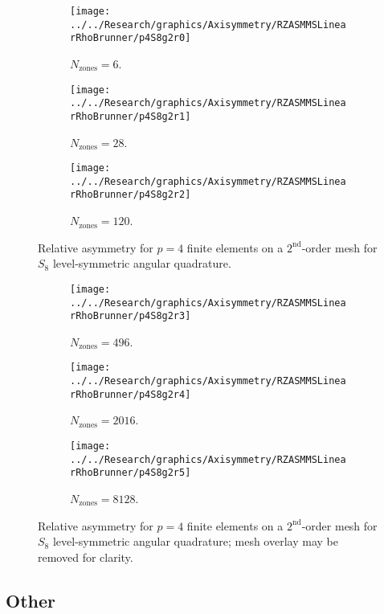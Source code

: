 \documentclass[12pt]{article}
\begin{document}
\begin{sidewaysfigure}[!htb]
\centering
\begin{subfigure}{0.33\textwidth}
\texttt{[image: ../../Research/graphics/Axisymmetry/RZASMMSLinearRhoBrunner/p4S8g2r0]}
\caption{$N_\text{zones}=6$.}
\end{subfigure}%
\begin{subfigure}{0.33\textwidth}
\texttt{[image: ../../Research/graphics/Axisymmetry/RZASMMSLinearRhoBrunner/p4S8g2r1]}
\caption{$N_\text{zones}=28$.}
\end{subfigure}%
\begin{subfigure}{0.33\textwidth}
\texttt{[image: ../../Research/graphics/Axisymmetry/RZASMMSLinearRhoBrunner/p4S8g2r2]}
\caption{$N_\text{zones}=120$.}
\end{subfigure}
\caption{Relative asymmetry for $p=4$ finite elements on a $2^\text{nd}$-order mesh for $S_8$ level-symmetric angular quadrature.}
\label{fig:RZASMMSLinearRhoBrunnerp4S8g2Part1}
\end{sidewaysfigure}

\begin{sidewaysfigure}[!htb]
\centering
\begin{subfigure}{0.33\textwidth}
\texttt{[image: ../../Research/graphics/Axisymmetry/RZASMMSLinearRhoBrunner/p4S8g2r3]}
\caption{$N_\text{zones}=496$.}
\end{subfigure}%
\begin{subfigure}{0.33\textwidth}
\texttt{[image: ../../Research/graphics/Axisymmetry/RZASMMSLinearRhoBrunner/p4S8g2r4]}
\caption{$N_\text{zones}=2016$.}
\end{subfigure}%
\begin{subfigure}{0.33\textwidth}
\texttt{[image: ../../Research/graphics/Axisymmetry/RZASMMSLinearRhoBrunner/p4S8g2r5]}
\caption{$N_\text{zones}=8128$.}
\end{subfigure}
\caption{Relative asymmetry for $p=4$ finite elements on a $2^\text{nd}$-order mesh for $S_8$ level-symmetric angular quadrature; mesh overlay may be removed for clarity.}
\label{fig:RZASMMSLinearRhoBrunnerp4S8g2Part2}
\end{sidewaysfigure}


\subsection{Other}
\end{document}
